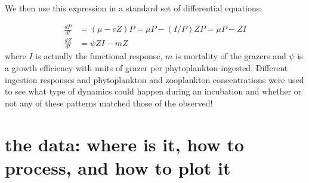 \documentclass[11pt]{article}
\begin{document}
 We then use this expression in a standard set of differential equations:
 
 \begin{align}
 \frac{dP}{dt} &= (\mu - cZ) P =  \mu P - (I/P) Z P= \mu P - ZI \\
 \frac{dZ}{dt} &= \psi ZI -mZ
 \end{align}
 where $I$ is actually the functional response, $m$ is mortality of the grazers and $\psi$ is a growth efficiency with units of grazer per phytoplankton ingested. Different ingestion responses and phytoplankton and zooplankton concentrations were used to see what type of dynamics could happen during an incubation and whether or not any of these patterns matched those of the observed!






\section{the data: where is it, how to process, and how to plot it}

\end{document}
